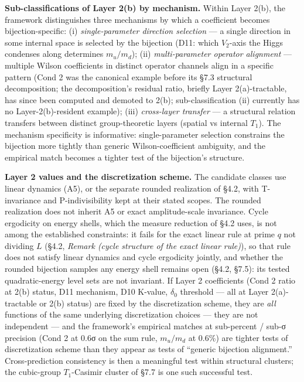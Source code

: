 \documentclass[
]{article}
\begin{document}
\textbf{Sub-classifications of Layer 2(b) by mechanism.} Within Layer
2(b), the framework distinguishes three mechanisms by which a
coefficient becomes bijection-specific: (i) \emph{single-parameter
direction selection} --- a single direction in some internal space is
selected by the bijection (D11: which \(V_2\)-axis the Higgs condenses
along determines \(m_u/m_d\)); (ii) \emph{multi-parameter operator
alignment} --- multiple Wilson coefficients in distinct operator
channels align in a specific pattern (Cond 2 was the canonical example
before its §7.3 structural decomposition; the decomposition's residual
ratio, briefly Layer 2(a)-tractable, has since been computed and demoted
to 2(b); sub-classification (ii) currently has no Layer-2(b)-resident
example); (iii) \emph{cross-layer transfer} --- a structural relation
transfers between distinct group-theoretic layers (spatial vs internal
\(T_1\)). The mechanism specificity is informative: single-parameter
selection constrains the bijection more tightly than generic
Wilson-coefficient ambiguity, and the empirical match becomes a tighter
test of the bijection's structure.

\textbf{Layer 2 values and the discretization scheme.} The candidate
classes use linear dynamics (A5), or the separate rounded realization of
§4.2, with T-invariance and P-indivisibility kept at their stated
scopes. The rounded realization does not inherit A5 or exact
amplitude-scale invariance. Cycle ergodicity on energy shells, which the
measure reduction of §4.2 uses, is not among the established
constraints: it fails for the exact linear rule at prime \(q\) not
dividing \(L\) (§4.2, \emph{Remark (cycle structure of the exact linear
rule)}), so that rule does not satisfy linear dynamics and cycle
ergodicity jointly, and whether the rounded bijection samples any energy
shell remains open (§4.2, §7.5): its tested quadratic-energy level sets
are not invariant. If Layer 2 coefficients (Cond 2 ratio at 2(b) status,
D11 mechanism, D10 K-value, \(\delta_0\) threshold --- all at Layer
2(a)-tractable or 2(b) status) are fixed by the discretization scheme,
they are \emph{all} functions of the same underlying discretization
choices --- they are not independent --- and the framework's empirical
matches at sub-percent / sub-σ precision (Cond 2 at 0.6σ on the sum
rule, \(m_u/m_d\) at 0.6\%) are tighter tests of discretization scheme
than they appear as tests of ``generic bijection alignment.''
Cross-prediction consistency is then a meaningful test within structural
clusters; the cubic-group \(T_1\)-Casimir cluster of §7.7 is one such
successful test.
\end{document}

